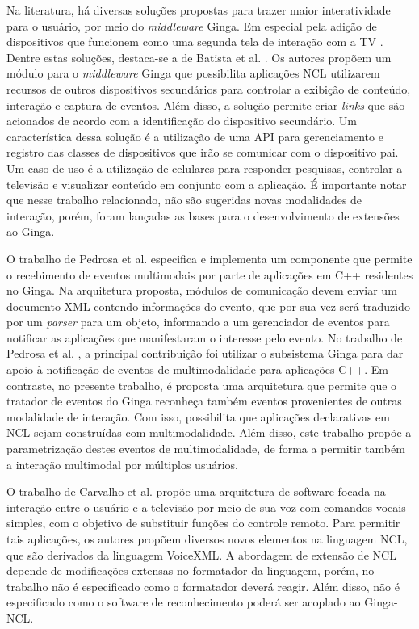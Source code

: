 Na literatura, há diversas soluções propostas para trazer maior interatividade para o usuário, por meio do \textit{middleware} Ginga. Em especial pela adição de dispositivos que funcionem como uma segunda tela de interação com a TV \cite{nery2008desenvolvimento}. Dentre estas soluções, destaca-se a de Batista et al. \cite{batista2010estendendo}. Os autores propõem um módulo para o \textit{middleware} Ginga que possibilita aplicações NCL utilizarem recursos de outros dispositivos secundários para controlar a exibição de conteúdo, interação e captura de eventos. Além disso, a solução permite criar \textit{links} que são acionados de acordo com a identificação do dispositivo secundário. Um característica dessa solução é a utilização de uma API para gerenciamento e registro das classes de dispositivos que irão se comunicar com o dispositivo pai. Um caso de uso é a utilização de celulares para responder pesquisas, controlar a televisão e visualizar conteúdo em conjunto com a aplicação. É importante notar que nesse trabalho relacionado, não são sugeridas novas modalidades de interação, porém, foram lançadas as bases para o desenvolvimento de extensões ao Ginga.

O trabalho de Pedrosa et al. \cite{pedrosa2010componente} especifica e implementa um componente que  permite o recebimento de eventos multimodais por parte de aplicações em C++ residentes no Ginga. Na arquitetura proposta, módulos de comunicação devem enviar um documento XML contendo informações do evento, que por sua vez será traduzido por um \textit{parser} para um objeto, informando a um gerenciador de eventos para notificar as aplicações que manifestaram o interesse pelo evento. No trabalho de Pedrosa et al. \cite{pedrosa2010componente}, a principal contribuição foi utilizar o subsistema Ginga para dar apoio à notificação de eventos de multimodalidade para aplicações C++. Em contraste, no presente trabalho, é proposta uma arquitetura que permite que o tratador de eventos do Ginga reconheça também eventos provenientes de outras modalidade de interação. Com isso, possibilita que aplicações declarativas em NCL sejam construídas com multimodalidade. Além disso, este trabalho propõe a parametrização destes eventos de multimodalidade, de forma a permitir também a interação multimodal por múltiplos usuários.

O trabalho de Carvalho et al. \cite{carvalho2010estendendo} propõe uma arquitetura de software focada na interação entre o usuário e a televisão por meio de sua voz com comandos vocais simples, com o objetivo de substituir funções do controle remoto. Para permitir tais aplicações, os autores propõem diversos novos elementos na linguagem NCL, que são derivados da linguagem VoiceXML. A abordagem de extensão de NCL depende de modificações extensas no formatador da linguagem, porém, no trabalho não é especificado como o formatador deverá reagir. Além disso, não é especificado como o software de reconhecimento poderá ser acoplado ao Ginga-NCL.

